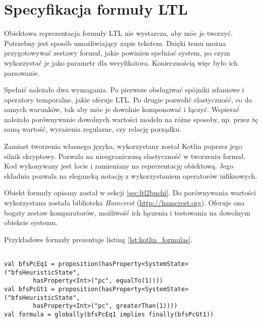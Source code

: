 \section{Specyfikacja formuły LTL} \label{sec:LTL_formula_spec}

Obiektowa reprezentacja formuły LTL nie wystarcza, aby móc je tworzyć.
Potrzebny jest sposób umożliwiający zapis tekstem.
Dzięki temu można przygotowywać zestawy formuł, jakie powinien spełniać system, po czym wykorzystać je jako parametr dla weryfikatora.
Koniecznością więc było ich parsowanie.

Spełnić należało dwa wymagania.
Po pierwsze obsługiwać spójniki zdaniowe i operatory temporalne, jakie oferuje LTL.
Po drugie pozwolić elastyczność, co do samych warunków, tak aby móc je dowolnie komponować i łączyć.
Wspierać należało porównywanie dowolnych wartości modelu na różne sposoby, np. przez tę samą wartość, wyrażenia regularne, czy relację porządku.

Zamiast tworzenia własnego języka, wykorzystany został Kotlin poprzez jego silnik skryptowy.
Pozwala na nieograniczoną elastyczność w tworzeniu formuł.
Kod wykonywany jest locie i zamieniany na reprezentację obiektową.
Jego składnia pozwala na elegancką notację z wykorzystaniem operatorów infiksowych.

Obiekt formuły opisany został w sekcji \ref{sec:ltl2buchi}.
Do porównywania wartości wykorzystana została biblioteka \textit{Hamcrest} (\url{http://hamcrest.org}).
Oferuje ona bogaty zestaw komparatorów, możliwość ich łączenia i testowania na dowolnym obiekcie systemu.

Przykładowe formuły prezentuje listing \ref{lst:kotlin_formulas}.

\begin{minipage}{\linewidth}
\begin{lstlisting}[caption={Przykładowe formuły LTL w języku Kotlin.},captionpos=b,label={lst:kotlin_formulas}]

val bfsPcEq1 = proposition(hasProperty<SystemState>("bfsHeuristicState", 
        hasProperty<Int>("pc", equalTo(1))))
val bfsPcGt1 = proposition(hasProperty<SystemState>("bfsHeuristicState",
        hasProperty<Int>("pc", greaterThan(1))))
val formula = globally(bfsPcEq1 implies finally(bfsPcGt1))


\end{lstlisting}
\end{minipage}



